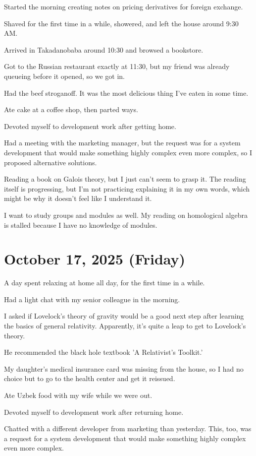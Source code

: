 \documentclass{article}
\begin{document}
Started the morning creating notes on pricing derivatives for foreign exchange.

Shaved for the first time in a while, showered, and left the house around 9:30 AM.

Arrived in Takadanobaba around 10:30 and browsed a bookstore.

Got to the Russian restaurant exactly at 11:30, but my friend was already queueing before it opened, so we got in.

Had the beef stroganoff. It was the most delicious thing I've eaten in some time.

Ate cake at a coffee shop, then parted ways.

Devoted myself to development work after getting home.

Had a meeting with the marketing manager, but the request was for a system development that would make something highly complex even more complex, so I proposed alternative solutions.

Reading a book on Galois theory, but I just can't seem to grasp it.
The reading itself is progressing, but I'm not practicing explaining it in my own words, which might be why it doesn't feel like I understand it.

I want to study groups and modules as well.
My reading on homological algebra is stalled because I have no knowledge of modules.

\section{October 17, 2025 (Friday)}

A day spent relaxing at home all day, for the first time in a while.

Had a light chat with my senior colleague in the morning.

I asked if Lovelock's theory of gravity would be a good next step after learning the basics of general relativity.
Apparently, it's quite a leap to get to Lovelock's theory.

He recommended the black hole textbook 'A Relativist's Toolkit.'

My daughter's medical insurance card was missing from the house, so I had no choice but to go to the health center and get it reissued.

Ate Uzbek food with my wife while we were out.

Devoted myself to development work after returning home.

Chatted with a different developer from marketing than yesterday.
This, too, was a request for a system development that would make something highly complex even more complex.
\end{document}
